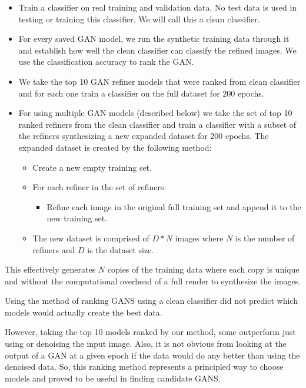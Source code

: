 \documentclass[10pt,twocolumn,letterpaper]{article}
\begin{document}
\begin{itemize}
\item Train a classifier on real training and validation data.  No test data is used in testing or training this classifier.  We will call this a clean classifier.
\item For every saved GAN model, we run the synthetic training data through it and establish how well the clean classifier can classify the refined images. We use the classification accuracy to rank the GAN.
\item We take the top 10 GAN refiner models that were ranked from clean classifier and for each one train a classifier on the full dataset for 200 epochs.  
\item For using multiple GAN models (described below) we take the set of top 10 ranked refiners from the clean classifier and train a classifier with a subset of the refiners synthesizing a new expanded dataset for 200 epochs. The expanded dataset is created by the following method:
\begin{itemize}
\item Create a new empty training set.
\item For each refiner in the set of refiners:
\begin{itemize}
\item Refine each image in the original full training set and append it to the new training set.
\end{itemize}
\item The new dataset is comprised of $D * N$ images where $N$ is the number of refiners and $D$ is the dataset size.
\end{itemize}
\end{itemize}

This effectively generates $N$ copies of the training data where each copy is unique and without the computational overhead of a full render to synthesize the images.

Using the method of ranking GANS using a clean classifier did not predict which models would actually create the best data. 

However, taking the top 10 models ranked by our method, some outperform just using or denoising the input image.  Also, it is not obvious from looking at the output of a GAN at a given epoch if the data would do any better than using the denoised data.  So, this ranking method represents a principled way to choose models and proved to be useful in finding candidate GANS.
\end{document}
